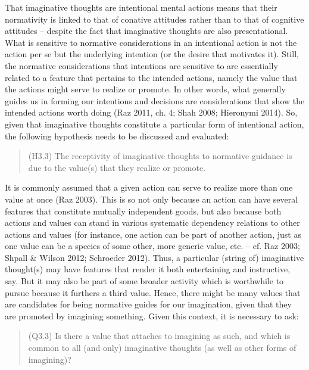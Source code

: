\noindent That imaginative thoughts are intentional mental actions means that their normativity is linked to that of conative attitudes rather than to that of cognitive attitudes -- despite the fact that imaginative thoughts are also presentational. What is sensitive to normative considerations in an intentional action is not the action per se but the underlying intention (or the desire that motivates it). Still, the normative considerations that intentions are sensitive to are essentially related to a feature that pertains to the intended actions, namely the value that the actions might serve to realize or promote. In other words, what generally guides us in forming our intentions and decisions are considerations that show the intended actions worth doing (Raz 2011, ch. 4; Shah 2008; Hieronymi 2014). So, given that imaginative thoughts constitute a particular form of intentional action, the following hypothesis needs to be discussed and evaluated:

\vspace{-.2cm}
\begin{quote}
(H3.3) The receptivity of imaginative thoughts to normative guidance is due to the value(s) that they realize or promote.
\end{quote}
\vspace{-.2cm}

\noindent It is commonly assumed that a given action can serve to realize more than one value at once (Raz 2003). This is so not only because an action can have several features that constitute mutually independent goods, but also because both actions and values can stand in various systematic dependency relations to other actions and values (for instance, one action can be part of another action, just as one value can be a species of some other, more generic value, etc. -- cf. Raz 2003; Shpall \& Wilson 2012; Schroeder 2012). Thus, a particular (string of) imaginative thought(s) may have features that render it both entertaining and instructive, say. But it may also be part of some broader activity which is worthwhile to pursue because it furthers a third value. Hence, there might be many values that are candidates for being normative guides for our imagination, given that they are promoted by imagining something. Given this context, it is necessary to ask:


\vspace{-.2cm}
\begin{quote}
(Q3.3) Is there a value that attaches to imagining as such, and which is common to all (and only) imaginative thoughts (as well as other forms of imagining)?
\end{quote}
\vspace{-.2cm}


